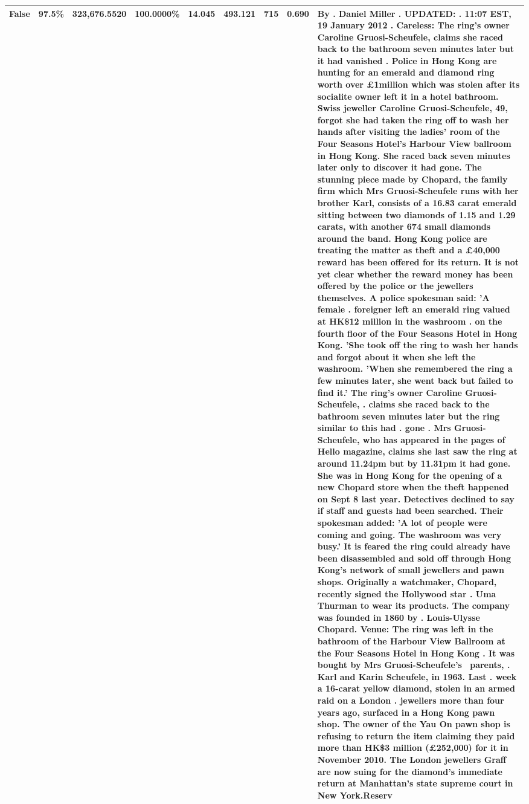 \begin{table}[H]
\begin{tabular}{lllrlllll}
\cline{1-9}
False & 97.5\% & 323,676.5520 & \bfseries \color{red} 100.0000\% & 14.045 & 493.121 & 715 & 0.690 & By . Daniel Miller . UPDATED: . 11:07 EST, 19 January 2012 . Careless: The ring's owner Caroline Gruosi-Scheufele, claims she raced back to the bathroom seven minutes later but it had vanished . Police in Hong Kong are hunting for an emerald and diamond ring worth over £1million which was stolen after its socialite owner left it in a hotel bathroom. Swiss jeweller Caroline Gruosi-Scheufele, 49, forgot she had taken the ring off to wash her hands after visiting the ladies' room of the Four Seasons Hotel's Harbour View ballroom in Hong Kong. She raced back seven minutes later only to discover it had gone. The stunning piece made by Chopard, the family firm which Mrs Gruosi-Scheufele runs with her brother Karl, consists of a 16.83 carat emerald sitting between two diamonds of 1.15 and 1.29 carats, with another 674 small diamonds around the band. Hong Kong police are treating the matter as theft and a £40,000 reward has been offered for its return. It is not yet clear whether the reward money has been offered by the police or the jewellers themselves. A police spokesman said: 'A female . foreigner left an emerald ring valued at HK\$12 million in the washroom . on the fourth floor of the Four Seasons Hotel in Hong Kong. 'She took off the ring to wash her hands and forgot about it when she left the washroom. 'When she remembered the ring a few minutes later, she went back but failed to find it.' The ring's owner Caroline Gruosi-Scheufele, . claims she raced back to the bathroom seven minutes later but the ring similar to this had . gone . Mrs Gruosi-Scheufele, who has appeared in the pages of Hello magazine, claims she last saw the ring at around 11.24pm but by 11.31pm it had gone. She was in Hong Kong for the opening of a new Chopard store when the theft happened on Sept 8 last year. Detectives declined to say if staff and guests had been searched. Their spokesman added: 'A lot of people were coming and going. The washroom was very busy.' It is feared the ring could already have been disassembled and sold off through Hong Kong's network of small jewellers and pawn shops. Originally a watchmaker, Chopard, recently signed the Hollywood star . Uma Thurman to wear its products. The company was founded in 1860 by . Louis-Ulysse Chopard. Venue: The ring was left in the bathroom of the Harbour View Ballroom at the Four Seasons Hotel in Hong Kong . It was bought by Mrs Gruosi-Scheufele's  parents, . Karl and Karin Scheufele, in 1963. Last . week a 16-carat yellow diamond, stolen in an armed raid on a London . jewellers more than four years ago, surfaced in a Hong Kong pawn shop. The owner of the Yau On pawn shop is refusing to return the item claiming they paid more than HK\$3 million (£252,000) for it in November 2010. The London jewellers Graff are now suing for the diamond’s immediate return at Manhattan’s state supreme court in New York.Reserv \\
\cline{1-9}
\bottomrule
\end{tabular}
\end{table}
